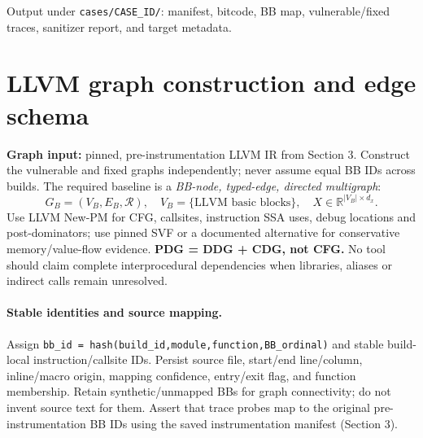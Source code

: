 \documentclass[10pt,a4paper]{article}
\begin{document}
\noindent Output under \texttt{cases/CASE\_ID/}: manifest, bitcode, BB map, vulnerable/fixed traces, sanitizer report, and target metadata.



\section{LLVM graph construction and edge schema}
\textbf{Graph input:} pinned, pre-instrumentation LLVM IR from Section 3. Construct the vulnerable and fixed graphs independently; never assume equal BB IDs across builds. The required baseline is a \emph{BB-node, typed-edge, directed multigraph}:
\[
 G_B=(V_B,E_B,\mathcal R),\quad V_B=\{\text{LLVM basic blocks}\},\quad X\in\mathbb R^{|V_B|\times d_x}.
\]
Use LLVM New-PM for CFG, callsites, instruction SSA uses, debug locations and post-dominators; use pinned SVF or a documented alternative for conservative memory/value-flow evidence. \textbf{PDG = DDG + CDG, not CFG.} No tool should claim complete interprocedural dependencies when libraries, aliases or indirect calls remain unresolved.

\paragraph{Stable identities and source mapping.}
Assign \texttt{bb\_id = hash(build\_id,module,function,BB\_ordinal)} and stable build-local instruction/callsite IDs. Persist source file, start/end line/column, inline/macro origin, mapping confidence, entry/exit flag, and function membership. Retain synthetic/unmapped BBs for graph connectivity; do not invent source text for them. Assert that trace probes map to the original pre-instrumentation BB IDs using the saved instrumentation manifest (Section 3).
\end{document}
